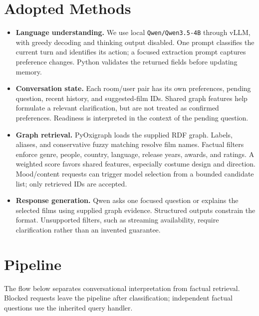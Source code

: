 \documentclass{article}
\begin{document}
\section{Adopted Methods}
\begin{itemize}
\setlength{\itemsep}{0pt}
\item \textbf{Language understanding.} We use local
\texttt{Qwen/Qwen3.5-4B} through vLLM, with greedy
decoding and thinking output disabled. One prompt classifies the current turn
and identifies its action; a focused extraction prompt captures preference
changes. Python validates the returned fields before updating memory.

\item \textbf{Conversation state.} Each room/user pair has its own preferences,
pending question, recent history, and suggested-film IDs. Shared graph features
help formulate a relevant clarification, but are not treated as confirmed
preferences. Readiness is interpreted in the context of the pending question.

\item \textbf{Graph retrieval.} PyOxigraph loads the supplied
RDF graph. Labels, aliases, and conservative fuzzy matching resolve film names.
Factual filters enforce genre, people, country, language, release years, awards,
and ratings. A weighted score favors shared features, especially costume design
and direction. Mood/content requests can trigger model selection from a bounded
candidate list; only retrieved IDs are accepted.

\item \textbf{Response generation.} Qwen asks one focused question or explains
the selected films using supplied graph evidence. Structured outputs constrain
the format. Unsupported filters, such as streaming availability, require
clarification rather than an invented guarantee.
\end{itemize}

\section{Pipeline}
The flow below separates conversational interpretation from factual retrieval.
Blocked requests leave the pipeline after classification; independent factual
questions use the inherited query handler.
\end{document}
